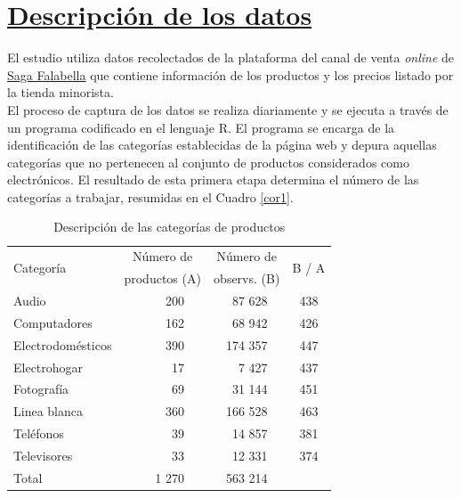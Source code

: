 \documentclass[12pt,a4paper,pdflatex]{article}
\begin{document}
\clearpage
\section{\underline{Descripción de los datos}}\label{sec4}

El estudio utiliza datos recolectados de la plataforma del canal de venta \textit{online} de \href{https://www.falabella.com.pe/falabella-pe/}{Saga Falabella} que contiene información de los productos y los precios listado por la tienda minorista. \\
El proceso de captura de los datos se realiza diariamente y se ejecuta a través de un programa codificado en el lenguaje R. El programa se encarga de la identificación de las categorías establecidas de la página web y depura aquellas categorías que no pertenecen al conjunto de productos considerados como electrónicos. El resultado de esta primera etapa determina el número de las categorías a trabajar, resumidas en el Cuadro \ref{cor1}. \\


\begin{table}[h!]
\caption{Descripción de las categorías de productos}\label{cor1}
\centering
\begin{tabular}{lcrccrcc}
\toprule
\multirow{2}{*}{Categoría}& \multicolumn{3}{c}{Número de}     & \multicolumn{3}{c}{Número de}          & \multirow{2}{*}{B / A} \\
                          & \multicolumn{3}{c}{productos (A)} & \multicolumn{3}{c}{observs. (B)}  &   \\
\midrule
Audio                     & &200    &                         &  &  87 628 & & 438\\
Computadores              & &162    &                         &  &  68 942 & & 426\\
Electrodomésticos         & &390    &                         &  & 174 357 & & 447\\
Electrohogar              & & 17    &                         &  &   7 427 & & 437\\
Fotografía                & & 69    &                         &  &  31 144 & & 451\\
\addlinespace
Linea blanca              & &360    &                         &  & 166 528 & & 463\\
Teléfonos                 & & 39    &                         &  &  14 857 & & 381\\
Televisores               & & 33    &                         &  &  12 331 & & 374\\
\midrule
Total                     & &1 270  &                         & &  563 214 & & \\
\bottomrule
\end{tabular}
\label{table:1}
\end{table}
\end{document}

